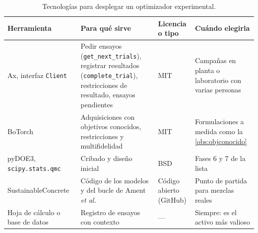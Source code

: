 \addtocounter{definicion}{1}%

\addtocounter{definicion}{1}%

\begin{table}[ht]
\centering\small
\begin{tabularx}{\textwidth}{@{}>{\raggedright\arraybackslash}p{2.8cm}>{\raggedright\arraybackslash}X>{\raggedright\arraybackslash}p{2.2cm}>{\raggedright\arraybackslash}p{3.3cm}@{}}
\toprule
Herramienta & Para qué sirve & Licencia o tipo & Cuándo elegirla \\
\midrule
Ax, interfaz \texttt{Client}~\cite{ax} & Pedir ensayos (\texttt{get\_next\_trials}), registrar resultados (\texttt{complete\_trial}), restricciones de resultado, ensayos pendientes & MIT & Campañas en planta o laboratorio con varias personas \\
BoTorch~\cite{botorch} & Adquisiciones con objetivos conocidos, restricciones y multifidelidad & MIT & Formulaciones a medida como la \cref{obs:objconocido} \\
pyDOE3, \texttt{scipy.stats.qmc} & Cribado y diseño inicial & BSD & Fases 6 y 7 de la lista \\
Sustainable\-Concrete~\cite{ament} & Código de los modelos y del bucle de Ament \emph{et al.} & Código abierto (GitHub) & Punto de partida para mezclas reales \\
Hoja de cálculo o base de datos & Registro de ensayos con contexto & — & Siempre: es el activo más valioso \\
\bottomrule
\end{tabularx}
\caption{Tecnologías para desplegar un optimizador experimental.}
\label{tab:tec5}
\end{table}

\addtocounter{definicion}{1}%

